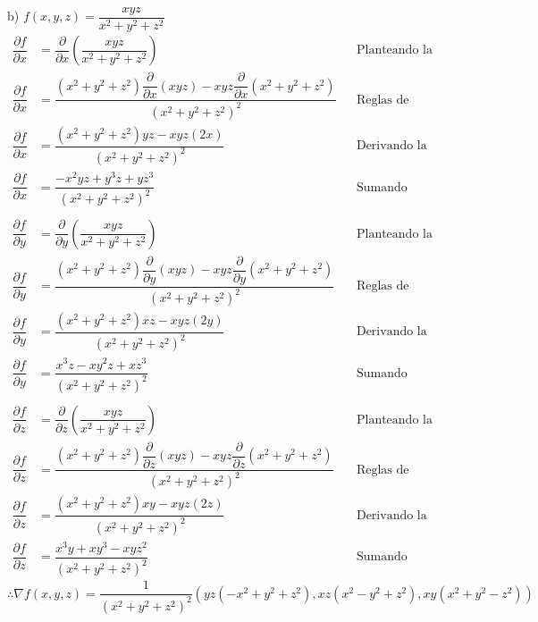 \documentclass[letterpaper]{article}
\renewcommand{\d}{\partial}
\renewcommand{\*}{\cdot}
\theoremstyle{definition}
\begin{document}
\noindent b) $f(x,y,z) = \dfrac{xyz}{x^2 +y^2 +z^2}$\\
\begin{align*}
	\dfrac{\d f}{\d x} &= \dfrac{\d}{\d x} \left(\dfrac{xyz}{x^2 +y^2 +z^2}\right) && \text{Planteando la derivada parcial}\\
	\dfrac{\d f}{\d x} &= \dfrac{ (x^2+y^2+z^2)\dfrac{\d}{\d x}(xyz) - xyz\dfrac{\d}{\d x}(x^2 + y^2 + z^2) }{(x^2 + y^2 + z^2)^2} && \text{Reglas de derivada de Calculo I}\\
	\dfrac{\d f}{\d x} &= \dfrac{ (x^2+y^2+z^2)yz - xyz(2x) }{(x^2 + y^2 + z^2)^2} && \text{Derivando la parcial }\\
	\dfrac{\d f}{\d x} &= \dfrac{ -x^2yz+y^3z+yz^3 }{(x^2 + y^2 + z^2)^2}&& \text{Sumando términos semejantes }\\
	\\
	\dfrac{\d f}{\d y} &= \dfrac{\d}{\d y} \left(\dfrac{xyz}{x^2 +y^2 +z^2}\right)&&\text{Planteando la derivada parcial}\\
		\dfrac{\d f}{\d y} &= \dfrac{ (x^2+y^2+z^2)\dfrac{\d}{\d y}(xyz) - xyz\dfrac{\d}{\d y}(x^2 + y^2 + z^2) }{(x^2 + y^2 + z^2)^2} && \text{Reglas de derivada de Calculo I}\\
	\dfrac{\d f}{\d y} &= \dfrac{ (x^2+y^2+z^2)xz - xyz(2y) }{(x^2 + y^2 + z^2)^2} && \text{Derivando la parcial }\\
	\dfrac{\d f}{\d y} &= \dfrac{ x^3z-xy^2z+xz^3 }{(x^2 + y^2 + z^2)^2}&& \text{Sumando términos semejantes }\\
	\\
	\dfrac{\d f}{\d z} &= \dfrac{\d}{\d z} \left(\dfrac{xyz}{x^2 +y^2 +z^2}\right) && \text{Planteando la derivada parcial}\\
		\dfrac{\d f}{\d z} &= \dfrac{ (x^2+y^2+z^2)\dfrac{\d}{\d z}(xyz) - xyz\dfrac{\d}{\d z}(x^2 + y^2 + z^2) }{(x^2 + y^2 + z^2)^2} && \text{Reglas de derivada de Calculo I}\\
	\dfrac{\d f}{\d z} &= \dfrac{ (x^2+y^2+z^2)xy - xyz(2z) }{(x^2 + y^2 + z^2)^2} && \text{Derivando la parcial }\\
	\dfrac{\d f}{\d z} &= \dfrac{ x^3y+xy^3-xyz^2 }{(x^2 + y^2 + z^2)^2}&& \text{Sumando términos semejantes }
\end{align*}
\[ \therefore \nabla f(x,y,z) = \dfrac{1}{(x^2 + y^2 + z^2)^2} \left(  yz(-x^2+y^2+z^2), xz(x^2-y^2+z^2), xy(x^2+y^2-z^2) \right) \]
\end{document}
